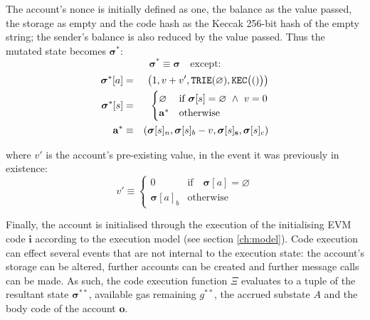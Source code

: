 \documentclass[9pt,oneside]{amsart}
\begin{document}
\begin{multicols}{2}
The account's nonce is initially defined as one, the balance as the value passed, the storage as empty and the code hash as the Keccak 256-bit hash of the empty string; the sender's balance is also reduced by the value passed. Thus the mutated state becomes $\boldsymbol{\sigma}^*$:
\begin{equation}
\boldsymbol{\sigma}^* \equiv \boldsymbol{\sigma} \quad \text{except:}
\end{equation}
\begin{eqnarray}
\boldsymbol{\sigma}^*[a] &=& \big( 1, v + v', \mathtt{\tiny TRIE}(\varnothing), \mathtt{\tiny KEC}\big(()\big) \big) \\
\boldsymbol{\sigma}^*[s] &=& \begin{cases}
\varnothing & \text{if}\ \boldsymbol{\sigma}[s] = \varnothing \ \wedge\ v = 0 \\
\mathbf{a}^* & \text{otherwise}
\end{cases} \\
\mathbf{a}^* &\equiv& (\boldsymbol{\sigma}[s]_n, \boldsymbol{\sigma}[s]_b - v, \boldsymbol{\sigma}[s]_\mathbf{s}, \boldsymbol{\sigma}[s]_c)
\end{eqnarray}

where $v'$ is the account's pre-existing value, in the event it was previously in existence:
\begin{equation}
v' \equiv \begin{cases}
0 & \text{if} \quad \boldsymbol{\sigma}[a] = \varnothing\\
\boldsymbol{\sigma}[a]_b & \text{otherwise}
\end{cases}
\end{equation}


Finally, the account is initialised through the execution of the initialising EVM code $\mathbf{i}$ according to the execution model (see section \ref{ch:model}). Code execution can effect several events that are not internal to the execution state: the account's storage can be altered, further accounts can be created and further message calls can be made. As such, the code execution function $\Xi$ evaluates to a tuple of the resultant state $\boldsymbol{\sigma}^{**}$, available gas remaining $g^{**}$, the accrued substate $A$ and the body code of the account $\mathbf{o}$.


\end{multicols}
\end{document}
